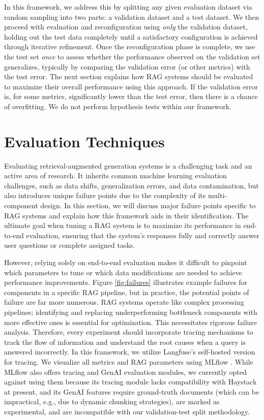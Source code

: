 In this framework, we address this by splitting any given evaluation dataset via random sampling into two parts: a validation dataset and a test dataset. We then proceed with evaluation and reconfiguration using \textit{only} the validation dataset, holding out the test data completely until a satisfactory configuration is achieved through iterative refinement. Once the reconfiguration phase is complete, we use the test set \textit{once} to assess whether the performance observed on the validation set generalizes, typically by comparing the validation error (or other metrics) with the test error. The next section explains how RAG systems should be evaluated to maximize their overall performance using this approach. If the validation error is, for some metrics, significantly lower than the test error, then there is a chance of overfitting. We do not perform hypothesis tests within our framework.

\section{Evaluation Techniques}

Evaluating retrieval-augmented generation systems is a challenging task and an active area of research. It inherits common machine learning evaluation challenges, such as data shifts, generalization errors, and data contamination, but also introduces unique failure points due to the complexity of its multi-component design. In this section, we will discuss major failure points specific to RAG systems and explain how this framework aids in their identification. The ultimate goal when tuning a RAG system is to maximize its performance in end-to-end evaluation, ensuring that the system's responses fully and correctly answer user questions or complete assigned tasks.

However, relying solely on end-to-end evaluation makes it difficult to pinpoint which parameters to tune or which data modifications are needed to achieve performance improvements. Figure \ref{fig:failures} illustrates example failures for components in a specific RAG pipeline, but in practice, the potential points of failure are far more numerous. RAG systems operate like complex processing pipelines; identifying and replacing underperforming bottleneck components with more effective ones is essential for optimization. This necessitates rigorous failure analysis. Therefore, every experiment should incorporate tracing mechanisms to track the flow of information and understand the root causes when a query is answered incorrectly. In this framework, we utilize Langfuse's \cite{Langfuse} self-hosted version for tracing. We visualize all metrics and RAG parameters using MLflow \cite{MLflow}. While MLflow also offers tracing and GenAI evaluation modules, we currently opted against using them because its tracing module lacks compatibility with Haystack at present, and its GenAI features require ground-truth documents (which can be impractical, e.g., due to dynamic chunking strategies), are marked as experimental, and are incompatible with our validation-test split methodology.

